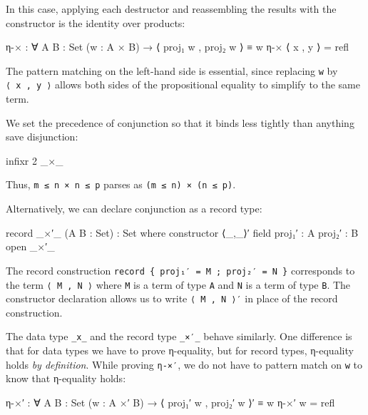 In this case, applying each destructor and reassembling the results with
the constructor is the identity over products:

\begin{fence}
\begin{code}
η-× : ∀ {A B : Set} (w : A × B) → ⟨ proj₁ w , proj₂ w ⟩ ≡ w
η-× ⟨ x , y ⟩ = refl
\end{code}
\end{fence}

The pattern matching on the left-hand side is essential, since replacing
\texttt{w} by \texttt{⟨\ x\ ,\ y\ ⟩} allows both sides of the
propositional equality to simplify to the same term.

We set the precedence of conjunction so that it binds less tightly than
anything save disjunction:

\begin{fence}
\begin{code}
infixr 2 _×_
\end{code}
\end{fence}

Thus, \texttt{m\ ≤\ n\ ×\ n\ ≤\ p} parses as
\texttt{(m\ ≤\ n)\ ×\ (n\ ≤\ p)}.

Alternatively, we can declare conjunction as a record type:

\begin{fence}
\begin{code}
record _×′_ (A B : Set) : Set where
  constructor ⟨_,_⟩′
  field
    proj₁′ : A
    proj₂′ : B
open _×′_
\end{code}
\end{fence}

The record construction
\texttt{record\ \{\ proj₁′\ =\ M\ ;\ proj₂′\ =\ N\ \}} corresponds to
the term \texttt{⟨\ M\ ,\ N\ ⟩} where \texttt{M} is a term of type
\texttt{A} and \texttt{N} is a term of type \texttt{B}. The constructor
declaration allows us to write \texttt{⟨\ M\ ,\ N\ ⟩′} in place of the
record construction.

The data type \texttt{\_x\_} and the record type \texttt{\_×′\_} behave
similarly. One difference is that for data types we have to prove
η-equality, but for record types, η-equality holds \emph{by definition}.
While proving \texttt{η-×′}, we do not have to pattern match on
\texttt{w} to know that η-equality holds:

\begin{fence}
\begin{code}
η-×′ : ∀ {A B : Set} (w : A ×′ B) → ⟨ proj₁′ w , proj₂′ w ⟩′ ≡ w
η-×′ w = refl
\end{code}
\end{fence}

